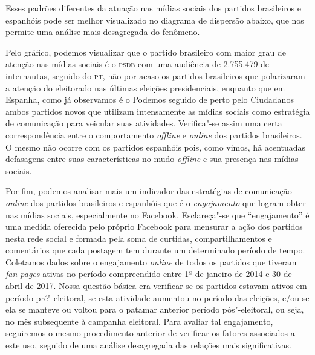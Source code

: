 Esses padrões diferentes da atuação nas mídias sociais dos partidos
brasileiros e espanhóis pode ser melhor visualizado no diagrama de
dispersão abaixo, que nos permite uma análise mais desagregada do
fenômeno.


Pelo gráfico, podemos visualizar que o partido brasileiro com maior grau
de atenção nas mídias sociais é o \textsc{psdb} com uma audiência de 2.755.479 de
internautas, seguido do \textsc{pt}, não por acaso os partidos brasileiros que
polarizaram a atenção do eleitorado nas últimas eleições presidenciais,
enquanto que em Espanha, como já observamos é o Podemos seguido de perto
pelo Ciudadanos ambos partidos novos que utilizam intensamente as mídias
sociais como estratégia de comunicação para veicular suas atividades.
Verifica"-se assim uma certa correspondência entre o comportamento
\emph{offline} e \emph{online} dos partidos brasileiros. O mesmo não ocorre com os
partidos espanhóis pois, como vimos, há acentuadas defasagens entre suas
características no mudo \emph{offline} e sua presença nas mídias sociais.

Por fim, podemos analisar mais um indicador das estratégias de
comunicação \emph{online} dos partidos brasileiros e espanhóis que é o
\emph{engajamento} que logram obter nas mídias sociais, especialmente no
Facebook. Esclareça"-se que ``engajamento'' é uma medida oferecida pelo
próprio Facebook para mensurar a ação dos partidos nesta rede social e
formada pela soma de curtidas, compartilhamentos e comentários que cada
postagem tem durante um determinado período de tempo. Coletamos dados
sobre o engajamento \emph{online} de todos os partidos que tiveram \emph{fan
pages} ativas no período compreendido entre 1º de janeiro de 2014 e 30
de abril de 2017. Nossa questão básica era verificar se os partidos
estavam ativos em período pré"-eleitoral, se esta atividade aumentou no
período das eleições, e/ou se ela se manteve ou voltou para o patamar
anterior período pós"-eleitoral, ou seja, no mês subsequente à campanha
eleitoral. Para avaliar tal engajamento, seguiremos o mesmo procedimento
anterior de verificar os fatores associados a este uso, seguido de uma
análise desagregada das relações mais significativas.

